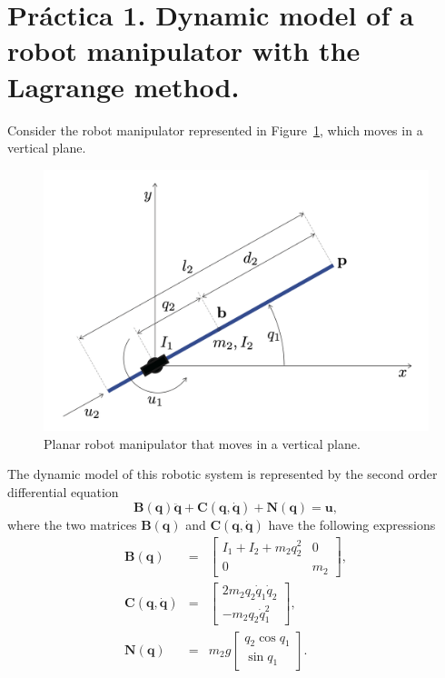 \documentclass{article}
\begin{document}
\section*{Pr\'actica 1. Dynamic model of a robot manipulator with the Lagrange method.}

Consider the robot manipulator represented in Figure~\ref{fig:figure_1}, which moves in a vertical plane.


\begin{figure}[H]
\centerline{\hspace{0cm}\includegraphics[width=0.66\columnwidth]{drawing}}
\caption{Planar robot manipulator that moves in a vertical plane.}
\label{fig:figure_1}
\end{figure}


The dynamic model of this robotic system is represented by the
second order differential equation 
\begin{equation*}
\mathbf{B}(\mathbf{q}) \ddot{\mathbf{q}}+ \mathbf{C}(\mathbf{q}, \dot{\mathbf{q}}) + \mathbf{N}(\mathbf{q}) = \mathbf{u},
\end{equation*}
where the two matrices $\mathbf{B}(\mathbf{q})$ and $\mathbf{C}(\mathbf{q}, \dot{\mathbf{q}})$ have the following expressions
\begin{eqnarray*}
\mathbf{B}(\mathbf{q}) &=&
\begin{bmatrix}
I_1 + I_2 + m_2 q_2^2 &0\\
0 & m_2
\end{bmatrix},\\
\mathbf{C}(\mathbf{q}, \dot{\mathbf{q}}) 
&=& 
\begin{bmatrix} 
2 m_2 q_2 \dot{q}_1  \dot{q}_2\\
- m_2 q_2 \dot{q}_1^2
\end{bmatrix},\\
\mathbf{N}(\mathbf{q}) 
&=& 
m_2 g
\begin{bmatrix}
q_2 \cos q_1\\
\sin q_1 
\end{bmatrix}.
\end{eqnarray*}
\end{document}
